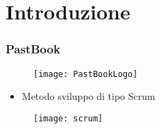 \section{Introduzione}
\begin{frame}
  \frametitle{PastBook}

  \begin{figure}[H]
    \centering
    \texttt{[image: PastBookLogo]}
  \end{figure}

  \begin{itemize}
  \item Metodo sviluppo di tipo Scrum
  \end{itemize}

  \begin{figure}[H]
    \centering
    \texttt{[image: scrum]}
  \end{figure}
\end{frame}
